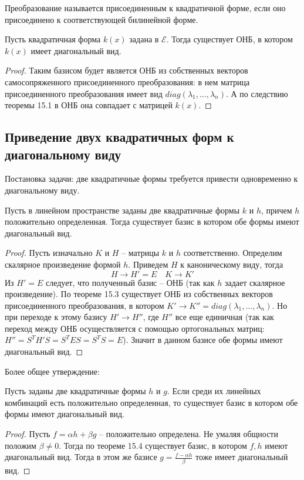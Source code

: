 \begin{definition}
    Преобразование называется присоединенным к квадратичной форме, если оно присоединено к соответствующей билинейной форме.
\end{definition}

\begin{theorem}
    Пусть квадратичная форма $k(x)$ задана в $\mathcal{E}$. Тогда существует ОНБ, в котором $k(x)$ имеет диагональный вид.
\end{theorem}
\begin{proof}
    Таким базисом будет является ОНБ из собственных векторов самосопряженного присоединенного преобразования: в нем матрица присоединенного преобразования имеет вид $diag(\lambda_1, \dots, \lambda_n)$. А по следствию теоремы 15.1 в ОНБ она совпадает с матрицей $k(x)$.
\end{proof}

\subsection{Приведение двух квадратичных форм к диагональному виду}
Постановка задачи: две квадратичные формы требуется привести одновременно к диагональному виду.

\begin{theorem}
    Пусть в линейном пространстве заданы две квадратичные формы $k$ и $h$, причем $h$ положительно определенная. Тогда существует базис в котором обе формы имеют диагональный вид.
\end{theorem}
\begin{proof}
    Пусть изначально $K$ и $H$ -- матрицы $k$ и $h$ соответственно. Определим скалярное произведение формой $h$. Приведем $H$ к каноническому виду, тогда 
    \[
    H\to H'=E\quad K\to K'
    \]
    Из $H'=E$ следует, что полученный базис -- ОНБ (так как $h$ задает скалярное произведение). По теореме 15.3 существует ОНБ из собственных векторов присоединенного преобразования, в котором $K'\to K''=diag(\lambda_1,\dots,\lambda_n)$. Но при переходе к этому базису $H'\to H''$, где $H''$ все еще единичная (так как переход между ОНБ осуществляется с помощью ортогональных матриц: $H''=S^TH'S=S^TES=S^TS=E$). Значит в данном базисе обе формы имеют диагональный вид.
\end{proof}
Более общее утверждение:
\begin{theorem}
    Пусть заданы две квадратичные формы $h$ и $g$. Если среди их линейных комбинаций есть положительно определенная, то существует базис в котором обе формы имеют диагональный вид.
\end{theorem}
\begin{proof}
    Пусть $f=\alpha h+\beta g$ -- положительно определена. Не умаляя общности положим $\beta\neq0$. Тогда по теореме 15.4 существует базис, в котором $f,h$ имеют диагональный вид. Тогда в этом же базисе $g=\frac{f-\alpha h}{\beta}$ тоже имеет диагональный вид.
\end{proof}

